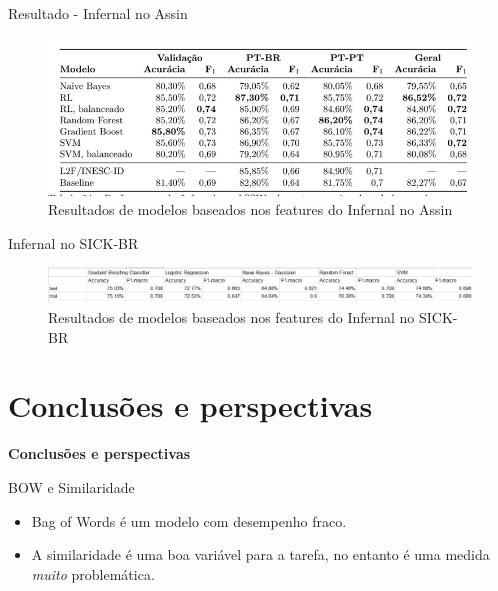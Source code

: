\documentclass{beamer}
\begin{document}
\begin{frame}[fragile]{Resultado - Infernal no Assin}
\begin{figure}
	\centering
	\includegraphics[width=0.7\linewidth]{Infernal-Assin}
	\caption{Resultados de modelos baseados nos features do Infernal no Assin}
	\label{fig:infernal-assin}
\end{figure}

\end{frame}

\begin{frame}[fragile]{Infernal no SICK-BR}
\begin{figure}
	\centering
	\includegraphics[width=0.7\linewidth]{Infernal-SICK-BR}
	\caption{Resultados de modelos baseados nos features do Infernal no SICK-BR}
	\label{fig:infernal-sick-br}
\end{figure}

\end{frame}


\section{Conclusões e perspectivas}
	\begin{frame}
\centering \textbf{Conclusões e perspectivas\\}
\end{frame}

\begin{frame}{BOW e Similaridade}
\begin{itemize}
	\item Bag of Words é um modelo com desempenho fraco.\\
	\item A similaridade é uma boa variável para a tarefa, no entanto é uma medida \textit{muito} problemática.
\end{itemize}

\end{frame}
\end{document}
